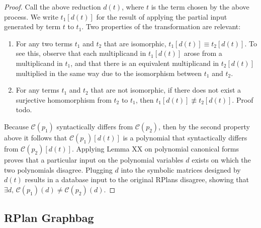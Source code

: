 \begin{proof}
Call the above reduction $d(t)$, where $t$ is the term chosen by the above process. We write $t_1[d(t)]$ for the result of applying the partial input generated by term $t$ to $t_1$. Two properties of the transformation are relevant:
\begin{enumerate}
    \item For any two terms $t_1$ and $t_2$ that are isomorphic, $t_1[d(t)] \equiv t_2[d(t)]$.
    To see this, observe that each multiplicand in $t_1[d(t)]$ arose from a multiplicand in $t_1$, and that there is an equivalent multiplicand in $t_2[d(t)]$ multiplied in the same way due to the isomorphism between $t_1$ and $t_2$.
    \item For any terms $t_1$ and $t_2$ that are not isomorphic, if there does not exist a surjective homomorphism from $t_2$ to $t_1$, then $t_1[d(t)] \not\equiv t_2[d(t)]$. Proof todo.
\end{enumerate}

Because $\mathcal{C}(p_1)$ syntactically differs from $\mathcal{C}(p_2)$, then by the second property above it follows that $\mathcal{C}(p_1)[d(t)]$ is a polynomial that syntactically differs from $\mathcal{C}(p_2)[d(t)]$.
Applying Lemma XX on polynomial canonical forms proves that a particular input on the polynomial variables $d$ exists on which the two polynomials disagree.  Plugging $d$ into the symbolic matrices designed by $d(t)$ results in a database input to the original RPlans disagree, showing that $\exists d,\, \mathcal{C}(p_1)(d) \neq \mathcal{C}(p_2)(d)$.
\end{proof}




\subsection{RPlan Graphbag}




